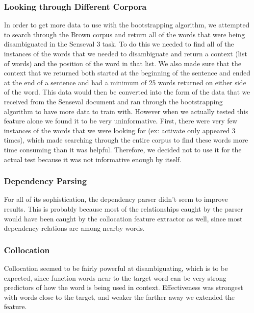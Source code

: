 \documentclass{article}
\begin{document}
\subsubsection{Looking through Different Corpora}

In order to get more data to use with the bootstrapping algorithm, we attempted
to search through the Brown corpus and return all of the words that were being
disambiguated in the Senseval 3 task.  To do this we needed to find all of the
instances of the words that we needed to disambiguate and return a context
(list of words) and the position of the word in that list.  We also made sure
that the context that we returned both started at the beginning of the
sentence and ended at the end of a sentence and had a minimum of 25 words
returned on either side of the word.  This data would then be converted into
the form of the data that we received from the Senseval document and ran
through the bootstrapping algorithm to have more data to train with.  However
when we actually tested this feature alone we found it to be very
uninformative.  First, there were very few instances of the words that we were
looking for (ex: activate only appeared 3 times), which made searching through
the entire corpus to find these words more time consuming than it was helpful.
Therefore, we decided not to use it for the actual test because it was not
informative enough by itself.


\subsubsection{Dependency Parsing}

For all of its sophistication, the dependency parser didn't seem to improve
results.  This is probably because most of the relationships caught by the
parser would have been caught by the collocation feature extractor as well,
since most dependency relations are among nearby words.

\subsubsection{Collocation}

Collocation seemed to be fairly powerful at disambiguating, which is to be
expected, since function words near to the target word can be very strong
predictors of how the word is being used in context.  Effectiveness was
strongest with words close to the target, and weaker the farther away we
extended the feature.
\end{document}
